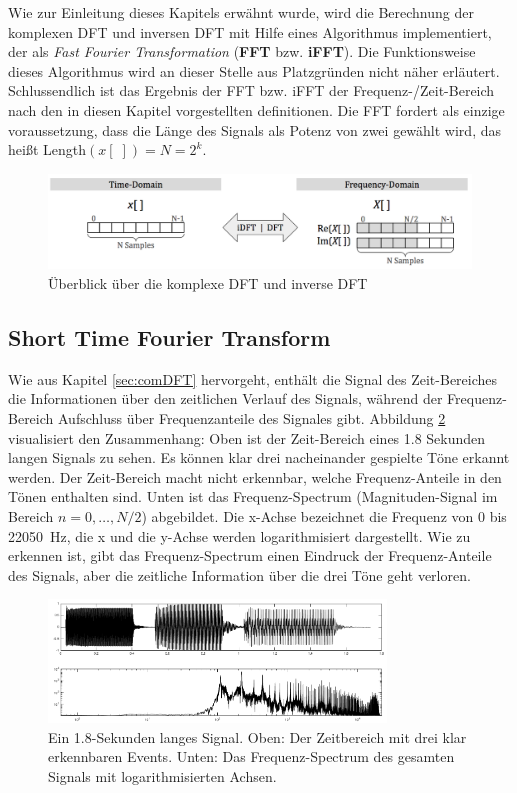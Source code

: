  
Wie zur Einleitung dieses Kapitels erwähnt wurde, wird die Berechnung der komplexen DFT und inversen DFT mit Hilfe eines Algorithmus implementiert, der als \emph{Fast Fourier Transformation} (\textbf{FFT} bzw. \textbf{iFFT}). Die Funktionsweise dieses Algorithmus wird an dieser Stelle aus Platzgründen nicht näher erläutert. Schlussendlich ist das Ergebnis der FFT bzw. iFFT der Frequenz-/Zeit-Bereich nach den in diesen Kapitel vorgestellten definitionen. Die FFT fordert als einzige voraussetzung, dass die Länge des Signals als Potenz von zwei gewählt wird, das heißt Length$(x[\;]) = N = 2^k$. \cite[S. 225 - 226]{dspGuide}

\begin{figure}[h]
	\centering
	\includegraphics[width=1\textwidth]{bilder/compDFTOverview02.png}
	\caption{Überblick über die komplexe DFT und inverse DFT}
	\label{img:complexDFTOverview}
\end{figure}

\subsection{Short Time Fourier Transform}
\label{sec:stft}

Wie aus Kapitel \ref{sec:comDFT} hervorgeht, enthält die Signal des Zeit-Bereiches die Informationen über den zeitlichen Verlauf des Signals, während der Frequenz-Bereich Aufschluss über Frequenzanteile des Signales gibt. Abbildung \ref{img:stft01} visualisiert den Zusammenhang: Oben ist der Zeit-Bereich eines 1.8 Sekunden langen Signals zu sehen. Es können klar drei nacheinander gespielte Töne erkannt werden. Der Zeit-Bereich macht nicht erkennbar, welche Frequenz-Anteile in den Tönen enthalten sind. Unten ist das Frequenz-Spectrum (Magnituden-Signal im Bereich  $n = 0 ,\ldots, N/2$) abgebildet. Die x-Achse bezeichnet die Frequenz von 0 bis \SI{22050}{\hertz}, die x und die y-Achse werden logarithmisiert dargestellt. Wie zu erkennen ist, gibt das Frequenz-Spectrum einen Eindruck der Frequenz-Anteile des Signals, aber die zeitliche Information über die drei Töne geht verloren.

 \begin{figure}[h]
	\centering
	\includegraphics[width=0.8\textwidth]{bilder/stft01.png}
	\caption{Ein 1.8-Sekunden langes Signal. Oben: Der Zeitbereich mit drei klar erkennbaren Events. Unten: Das Frequenz-Spectrum des gesamten Signals mit logarithmisierten Achsen.}
	\label{img:stft01}
\end{figure}

